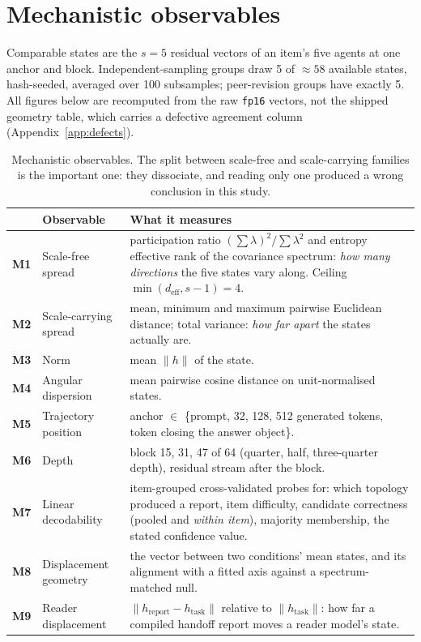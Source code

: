 \documentclass[10pt,a4paper]{article}
\newcommand{\mx}[1]{\textbf{#1}}
\begin{document}
\section{Mechanistic observables}\label{sec:mech}

Comparable states are the $s=5$ residual vectors of an item's five agents at one anchor and block. Independent-sampling groups draw 5 of $\approx58$ available states, hash-seeded, averaged over 100 subsamples; peer-revision groups have exactly 5. All figures below are recomputed from the raw \texttt{fp16} vectors, not the shipped geometry table, which carries a defective agreement column (Appendix~\ref{app:defects}).

\begin{table}[H]\centering\small
\caption{Mechanistic observables. The split between scale-free and scale-carrying families is the important one: they dissociate, and reading only one produced a wrong conclusion in this study.}
\label{tab:mech}
\begin{tabular}{@{}llp{8.6cm}@{}}
\toprule
& Observable & What it measures \\
\midrule
\mx{M1} & Scale-free spread & participation ratio $(\sum\lambda)^2/\sum\lambda^2$ and entropy effective rank of the covariance spectrum: \emph{how many directions} the five states vary along. Ceiling $\min(d_{\text{eff}},s-1)=4$. \\
\mx{M2} & Scale-carrying spread & mean, minimum and maximum pairwise Euclidean distance; total variance: \emph{how far apart} the states actually are. \\
\mx{M3} & Norm & mean $\lVert h\rVert$ of the state. \\
\mx{M4} & Angular dispersion & mean pairwise cosine distance on unit-normalised states. \\
\mx{M5} & Trajectory position & anchor $\in$ \{prompt, 32, 128, 512 generated tokens, token closing the answer object\}. \\
\mx{M6} & Depth & block 15, 31, 47 of 64 (quarter, half, three-quarter depth), residual stream after the block. \\
\mx{M7} & Linear decodability & item-grouped cross-validated probes for: which topology produced a report, item difficulty, candidate correctness (pooled and \emph{within item}), majority membership, the stated confidence value. \\
\mx{M8} & Displacement geometry & the vector between two conditions' mean states, and its alignment with a fitted axis against a spectrum-matched null. \\
\mx{M9} & Reader displacement & $\lVert h_{\text{report}}-h_{\text{task}}\rVert$ relative to $\lVert h_{\text{task}}\rVert$: how far a compiled handoff report moves a reader model's state. \\
\bottomrule
\end{tabular}
\end{table}
\end{document}
